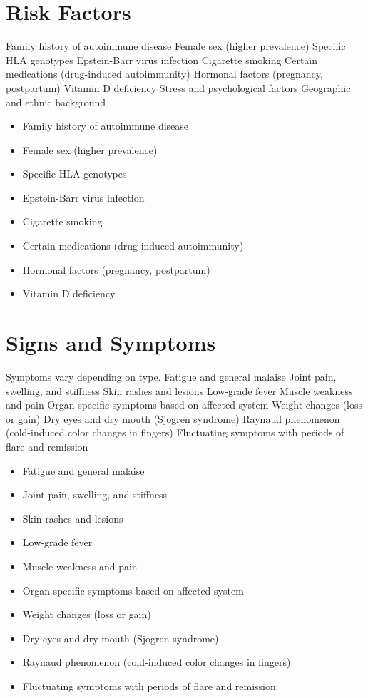 \section{Risk Factors}
Family history of autoimmune disease Female sex (higher prevalence) Specific HLA genotypes Epstein-Barr virus infection Cigarette smoking Certain medications (drug-induced autoimmunity) Hormonal factors (pregnancy, postpartum) Vitamin D deficiency Stress and psychological factors Geographic and ethnic background

\begin{itemize}[noitemsep]
  \item Family history of autoimmune disease
  \item Female sex (higher prevalence)
  \item Specific HLA genotypes
  \item Epstein-Barr virus infection
  \item Cigarette smoking
  \item Certain medications (drug-induced autoimmunity)
  \item Hormonal factors (pregnancy, postpartum)
  \item Vitamin D deficiency
\end{itemize}
\section{Signs and Symptoms}
Symptoms vary depending on type. Fatigue and general malaise Joint pain, swelling, and stiffness Skin rashes and lesions Low-grade fever Muscle weakness and pain Organ-specific symptoms based on affected system Weight changes (loss or gain) Dry eyes and dry mouth (Sjogren syndrome) Raynaud phenomenon (cold-induced color changes in fingers) Fluctuating symptoms with periods of flare and remission

\begin{itemize}[noitemsep]
  \item Fatigue and general malaise
  \item Joint pain, swelling, and stiffness
  \item Skin rashes and lesions
  \item Low-grade fever
  \item Muscle weakness and pain
  \item Organ-specific symptoms based on affected system
  \item Weight changes (loss or gain)
  \item Dry eyes and dry mouth (Sjogren syndrome)
  \item Raynaud phenomenon (cold-induced color changes in fingers)
  \item Fluctuating symptoms with periods of flare and remission
\end{itemize}
